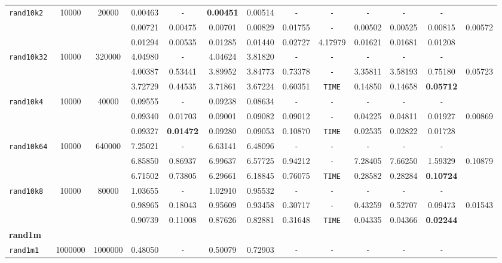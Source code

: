 \begin{table}
{\begin{tabular}{ l c c | c c c c c c c c c || c }
\hline
\verb|rand10k2| & 10000 & 20000 & 0.00463 & \verb|-| & \textbf{0.00451} & 0.00514 & \verb|-| & \verb|-| & \verb|-| & \verb|-| & \verb|-| & \\
 &  &  & 0.00721 & 0.00475 & 0.00701 & 0.00829 & 0.01755 & \verb|-| & 0.00502 & 0.00525 & 0.00815 & 0.00572 \\
 &  &  & 0.01294 & 0.00535 & 0.01285 & 0.01440 & 0.02727 & 4.17979 & 0.01621 & 0.01681 & 0.01208 & \\
\hline
\verb|rand10k32| & 10000 & 320000 & 4.04980 & \verb|-| & 4.04624 & 3.81820 & \verb|-| & \verb|-| & \verb|-| & \verb|-| & \verb|-| & \\
 &  &  & 4.00387 & 0.53441 & 3.89952 & 3.84773 & 0.73378 & \verb|-| & 3.35811 & 3.58193 & 0.75180 & 0.05723 \\
 &  &  & 3.72729 & 0.44535 & 3.71861 & 3.67224 & 0.60351 & \verb|TIME| & 0.14850 & 0.14658 & \textbf{0.05712} & \\
\hline
\verb|rand10k4| & 10000 & 40000 & 0.09555 & \verb|-| & 0.09238 & 0.08634 & \verb|-| & \verb|-| & \verb|-| & \verb|-| & \verb|-| & \\
 &  &  & 0.09340 & 0.01703 & 0.09001 & 0.09082 & 0.09012 & \verb|-| & 0.04225 & 0.04811 & 0.01927 & 0.00869 \\
 &  &  & 0.09327 & \textbf{0.01472} & 0.09280 & 0.09053 & 0.10870 & \verb|TIME| & 0.02535 & 0.02822 & 0.01728 & \\
\hline
\verb|rand10k64| & 10000 & 640000 & 7.25021 & \verb|-| & 6.63141 & 6.48096 & \verb|-| & \verb|-| & \verb|-| & \verb|-| & \verb|-| & \\
 &  &  & 6.85850 & 0.86937 & 6.99637 & 6.57725 & 0.94212 & \verb|-| & 7.28405 & 7.66250 & 1.59329 & 0.10879 \\
 &  &  & 6.71502 & 0.73805 & 6.29661 & 6.18845 & 0.76075 & \verb|TIME| & 0.28582 & 0.28284 & \textbf{0.10724} & \\
\hline
\verb|rand10k8| & 10000 & 80000 & 1.03655 & \verb|-| & 1.02910 & 0.95532 & \verb|-| & \verb|-| & \verb|-| & \verb|-| & \verb|-| & \\
 &  &  & 0.98965 & 0.18043 & 0.95609 & 0.93458 & 0.30717 & \verb|-| & 0.43259 & 0.52707 & 0.09473 & 0.01543 \\
 &  &  & 0.90739 & 0.11008 & 0.87626 & 0.82881 & 0.31648 & \verb|TIME| & 0.04335 & 0.04366 & \textbf{0.02244} & \\
\hline
\multicolumn{13}{l}{\textbf{rand1m}} \\
\hline
\verb|rand1m1| & 1000000 & 1000000 & 0.48050 & \verb|-| & 0.50079 & 0.72903 & \verb|-| & \verb|-| & \verb|-| & \verb|-| & \verb|-| & \\

\end{tabular}}
\end{table}
